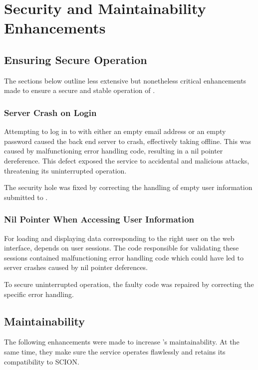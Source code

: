 \chapter{Security and Maintainability Enhancements}
\label{misc}

\section{Ensuring Secure Operation}

The sections below outline less extensive but nonetheless critical enhancements made to ensure a secure and stable operation of \lcs.

\subsection{Server Crash on Login}

Attempting to log in to \lcs with either an empty email address or an empty password caused the back end server to crash, effectively taking \lcs offline. This was caused by malfunctioning error handling code, resulting in a nil pointer dereference. This defect exposed the service to accidental and malicious attacks, threatening its uninterrupted operation.

The security hole was fixed by correcting the handling of empty user information submitted to \lcs. 

\subsection{Nil Pointer When Accessing User Information}

For loading and displaying data corresponding to the right user on the web interface, \lcs depends on user sessions. The code responsible for validating these sessions contained malfunctioning error handling code which could have led to server crashes caused by nil pointer deferences.

To secure uninterrupted operation, the faulty code was repaired by correcting the specific error handling.

\section{Maintainability}

The following enhancements were made to increase \lcs's maintainability.  At the same time, they make sure the service operates flawlessly and retains its compatibility to SCION.

